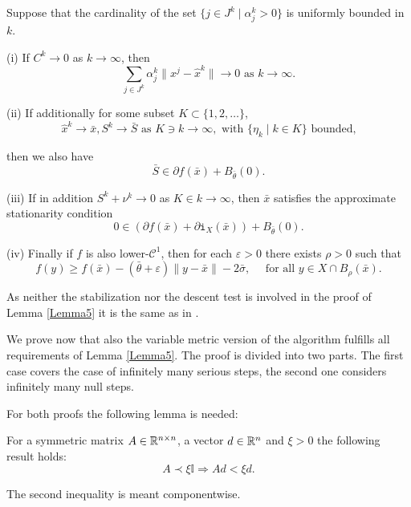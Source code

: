 \begin{lemma}\label{Lemma5}
	Suppose that the cardinality of the set \(\{j \in J^k\mid \alpha_j^k > 0\}\) is uniformly bounded in \(k\).
	
	(i) If \(C^k \to 0\) as \(k \to \infty\), then 
	\[ \sum_{j \in J^k}\alpha_j^k\|x^j-\hat{x}^k\| \to 0 \text{ as } k \to \infty. \]
	
	(ii) If additionally for some subset \(K \subset \{1,2,\dots\}\),
	\[\hat{x}^k \to \bar{x}, S^k \to \bar{S} \text{ as } K \ni k \to \infty, \text{ with } \{\eta_k\mid k \in K\} \text{ bounded,} \]
	
	then we also have 
	\[\bar{S} \in \partial f(\bar{x})+B_{\bar{\theta}}(0).\]
	
	(iii) If in addition \(S^k + \nu^k \to 0\) as \(K \in k \to \infty\), then \(\bar{x}\) satisfies the approximate stationarity condition 
	\begin{equation}
		0 \in \left(\partial f(\bar{x}) + \partial \mathtt{i}_X(\bar{x}) \right) + B_{\bar{\theta}}(0).
	\end{equation}
	
	(iv) Finally if \(f\) is also lower-\(\mathcal{C}^1\), then for each \(\varepsilon > 0\) there exists \(\rho > 0\) such that
	\begin{equation}
		f(y) \geq f(\bar{x})-(\bar{\theta}+\varepsilon)\|y-\bar{x}\|-2\bar{\sigma}, \quad \text{ for all } y \in X\cap B_{\rho}(\bar{x}).
	\end{equation}
\end{lemma}

As neither the stabilization nor the descent test is involved in the proof of Lemma \ref{Lemma5} it is the same as in \cite{Hare2016}.

We prove now that also the variable metric version of the algorithm fulfills all requirements of Lemma \ref{Lemma5}.
The proof is divided into two parts. The first case covers the case of infinitely many serious steps, the second one considers infinitely many null steps.

For both proofs the following lemma is needed:

\begin{lemma}
	For a symmetric matrix \(A \in \mathbb{R}^{n\times n}\), a vector \(d\in \mathbb{R}^n\) and \(\xi > 0\) the following result holds: 
	\[ A \prec \xi \mathbb{I} \Rightarrow Ad < \xi d. \]
	
	The second inequality is meant componentwise.
\end{lemma}


